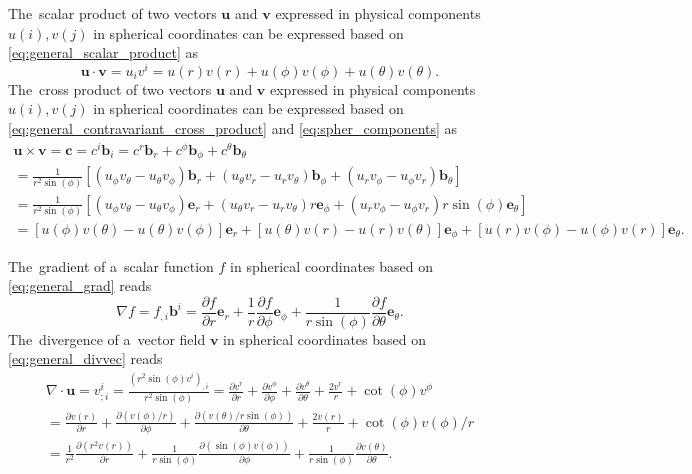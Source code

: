 \documentclass[review]{elsarticle}
\newcommand{\pdv}[2]{\frac{\partial{#1}}{\partial{#2}}}
\newcommand{\vect}[1]{\boldsymbol{#1}}
\begin{document}
The~scalar product of two vectors $\vect{u}$ and $\vect{v}$ expressed 
in physical components $u(i), v(j)$ in spherical coordinates can be expressed 
based on \eqref{eq:general_scalar_product} as
\begin{equation}
  \vect{u}\cdot\vect{v} = u_i v^i = u(r)v(r) + u(\phi)v(\phi) 
  + u(\theta)v(\theta) .
  \label{eq:spher_scalar_product}
\end{equation}
The~cross product of two vectors $\vect{u}$ and $\vect{v}$ expressed 
in physical components $u(i), v(j)$ in spherical coordinates can be expressed 
based on \eqref{eq:general_contravariant_cross_product} 
and \eqref{eq:spher_components} as
\begin{multline}
  \vect{u}\times\vect{v} = \vect{c} = c^i \vect{b}_i = 
  c^r \vect{b}_r + c^\phi \vect{b}_\phi
  + c^\theta \vect{b}_\theta \\
  = \frac{1}{r^2\sin(\phi)}\left[
  (u_\phi v_\theta - u_\theta v_\phi) \vect{b}_r 
  +  (u_\theta v_r - u_r v_\theta) \vect{b}_\phi
  +  (u_r v_\phi - u_\phi v_r)\vect{b}_\theta
  \right] \\
  = \frac{1}{r^2\sin(\phi)}\left[
  (u_\phi v_\theta - u_\theta v_\phi) \vect{e}_r 
  +  (u_\theta v_r - u_r v_\theta) r\vect{e}_\phi
  +  (u_r v_\phi - u_\phi v_r)r\sin(\phi)\vect{e}_\theta
  \right] \\
 = [u(\phi) v(\theta) - u(\theta) v(\phi)] \vect{e}_r
 + [u(\theta) v(r) - u(r) v(\theta)] \vect{e}_\phi
 + [u(r) v(\phi) - u(\phi) v(r)]\vect{e}_\theta .
 \label{eq:spher_cross_product}
\end{multline}

The~gradient of a~scalar function $f$ in spherical coordinates based on 
\eqref{eq:general_grad} reads
\begin{equation}
  \nabla f = f_{,i}\vect{b}^i = \pdv{f}{r}\vect{e}_r 
  + \frac{1}{r}\pdv{f}{\phi}\vect{e}_\phi
  + \frac{1}{r\sin(\phi)}\pdv{f}{\theta}\vect{e}_{\theta} .
  \label{eq:spher_gradf}
\end{equation}
The~divergence of a~vector field $\vect{v}$ in spherical coordinates based on
\eqref{eq:general_divvec} reads
\begin{multline}
  \nabla\cdot\vect{u} = v^i_{;i} = 
  \frac{(r^2\sin(\phi)v^i)_{,i}}{r^2\sin(\phi)}
  = \pdv{v^r}{r} + \pdv{v^\phi}{\phi} + \pdv{v^\theta}{\theta} 
  + \frac{2v^r}{r} + \cot(\phi) v^\phi \\
  = \pdv{v(r)}{r} + \pdv{(v(\phi)/r)}{\phi} 
  + \pdv{(v(\theta)/r\sin(\phi))}{\theta} 
  + \frac{2 v(r)}{r} + \cot(\phi) v(\phi)/r \\
  = \frac{1}{r^2}\pdv{(r^2v(r))}{r} 
  + \frac{1}{r\sin(\phi)}\pdv{(\sin(\phi)v(\phi))}{\phi} 
  + \frac{1}{r\sin(\phi)}\pdv{v(\theta)}{\theta} .
  \label{eq:spher_gradf}
\end{multline}
\end{document}
